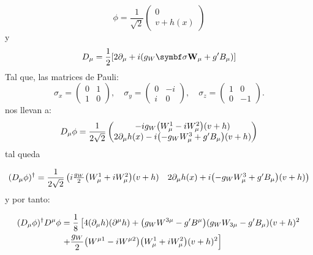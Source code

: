 \begin{equation}
	\phi =  \frac{1}{\sqrt{2}}  \begin{pmatrix}
		0 \\ 
		v + h(x) 
	\end{pmatrix}
\end{equation}
y 
\begin{equation}
	D_\mu =  \frac{1}{2}\bqty{2\partial_\mu + i (g_W \sigman \Wn_\mu  + g' B_\mu)} 
\end{equation}
Tal que, las matrices de Pauli: 
\[
\sigma_x = 
\begin{pmatrix}
0 & 1 \\[4pt]
1 & 0
\end{pmatrix},
\quad
\sigma_y = 
\begin{pmatrix}
0 & -i \\[4pt]
i & 0
\end{pmatrix},
\quad
\sigma_z = 
\begin{pmatrix}
1 & 0 \\[4pt]
0 & -1
\end{pmatrix}.
\]
nos llevan a: 
\begin{equation}
	D_\mu \phi = \frac{1}{2 \sqrt{2}} \begin{pmatrix}
		-i g_W\pqty{ W^{1}_{\mu} - i W_\mu^2}(v+h) \\
		2\partial_\mu h(x) -i \pqty{-g_W W^{3}_{\mu} + g' B_\mu}(v+h)
	\end{pmatrix}
\end{equation}
tal queda

\begin{equation}
	(D_\mu \phi)^\dagger =  \frac{1}{2 \sqrt{2}} \begin{pmatrix}
		i \frac{g_W}{2}\pqty{ W_{\mu}^{1} + i W_{\mu}^{2}}(v+h)  & 
		2\partial_\mu h(x) + i \pqty{-g_W W^{3}_{\mu} + g' B_\mu}(v+h)
	\end{pmatrix}
\end{equation}
y por tanto: 

\begin{align}
	(D_\mu \phi)^\dagger D^\mu \phi & = \frac{1}{8} \left[ 4 (\partial_\mu h )(\partial^\mu h ) + \pqty{g_W W^{3 \mu} - g' B^\mu}\pqty{g_W W_{3 \mu} - g' B_\mu}(v+h)^2 \right. \nonumber \\
	& \left. + \frac{g_W}{2}\pqty{ W^{\mu 1} - i W^{\mu 2}}\pqty{ W_{\mu}^{1} + i W_{\mu}^{2}}(v+h)^2
	\right]
\end{align}




